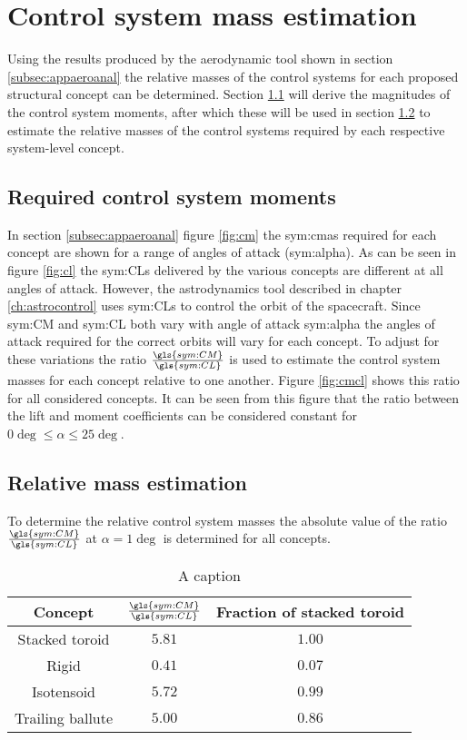 \section{Control system mass estimation}
\label{sec:controlmass}
Using the results produced by the aerodynamic tool shown in section \ref{subsec:appaeroanal} the relative masses of the control systems for each proposed structural concept can be determined. Section \ref{subsec:controlmoments} will derive the magnitudes of the control system moments, after which these will be used in section \ref{subsec:controlmassest} to estimate the relative masses of the control systems required by each respective system-level concept.

\subsection{Required control system moments}
\label{subsec:controlmoments}
In section \ref{subsec:appaeroanal} figure \ref{fig:cm} the \glspl{sym:cma} required for each concept are shown for a range of angles of attack (\gls{sym:alpha}). As can be seen in figure \ref{fig:cl} the \glspl{sym:CL} delivered by the various concepts are different at all angles of attack. However, the astrodynamics tool described in chapter \ref{ch:astrocontrol} uses \glspl{sym:CL} to control the orbit of the spacecraft. Since \gls{sym:CM} and \gls{sym:CL} both vary with angle of attack \gls{sym:alpha} the angles of attack required for the correct orbits will vary for each concept. To adjust for these variations the ratio $\frac{\gls{sym:CM}}{\gls{sym:CL}}$ is used to estimate the control system masses for each concept relative to one another. Figure \ref{fig:cmcl} shows this ratio for all considered concepts. It can be seen from this figure that the ratio between the lift and moment coefficients can be considered constant for $0\deg\leq\alpha\leq 25\deg$.

\subsection{Relative mass estimation}
\label{subsec:controlmassest}
To determine the relative control system masses the absolute value of the ratio $\frac{\gls{sym:CM}}{\gls{sym:CL}}$ at $\alpha=1\deg$ is determined for all concepts.
\begin{table}[h]
	\centering
	\caption{A caption}
	\begin{tabular}{|c|c|c|}
		\hline
		\textbf{Concept} & $\frac{\gls{sym:CM}}{\gls{sym:CL}}$ & Fraction of stacked toroid \\ \hline \hline
		Stacked toroid & $5.81$ & $1.00$\\
		Rigid & $0.41$ & $0.07$\\
		Isotensoid & $5.72$ & $0.99$\\
		Trailing ballute & $5.00$ & $0.86$\\
		\hline
	\end{tabular}
	\label{tab:controlmass}
\end{table}